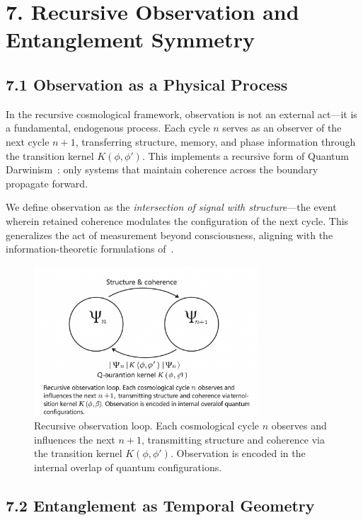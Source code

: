 \section*{7. Recursive Observation and Entanglement Symmetry}
\label{sec:recursive-observation}

\subsection*{7.1 Observation as a Physical Process}

In the recursive cosmological framework, observation is not an external act—it is a fundamental, endogenous process. Each cycle \( n \) serves as an observer of the next cycle \( n+1 \), transferring structure, memory, and phase information through the transition kernel \( K(\phi, \phi') \). This implements a recursive form of Quantum Darwinism~\cite{zurek_quantum_2009,zurek_environment-induced_2003}: only systems that maintain coherence across the boundary propagate forward.

We define observation as the \textit{intersection of signal with structure}—the event wherein retained coherence modulates the configuration of the next cycle. This generalizes the act of measurement beyond consciousness, aligning with the information-theoretic formulations of~\cite{tegmark_consciousness_2015}.
\begin{figure}[H]
\centering
\includegraphics[width=0.75\textwidth]{figures/recursive_observation_loop.png}
\caption{Recursive observation loop. Each cosmological cycle \( n \) observes and influences the next \( n+1 \), transmitting structure and coherence via the transition kernel \( K(\phi, \phi') \). Observation is encoded in the internal overlap of quantum configurations.}
\label{fig:recursive-observation}
\end{figure}


\subsection*{7.2 Entanglement as Temporal Geometry}

